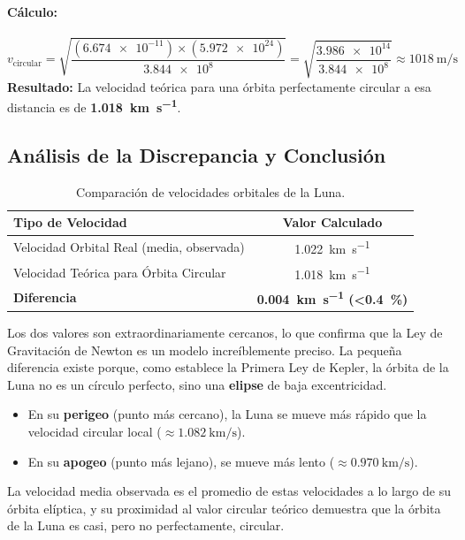 \documentclass[11pt,a4paper]{book}
\begin{document}
\paragraph{Cálculo:}
\[ 
v_{\text{circular}} = \sqrt{\frac{(\num{6.674e-11}) \times (\num{5.972e24})}{\num{3.844e8}}} 
= \sqrt{\frac{\num{3.986e14}}{\num{3.844e8}}} 
\approx \SI{1018}{\meter\per\second} 
\]
\textbf{Resultado:} La velocidad teórica para una órbita perfectamente circular a esa distancia es de \textbf{\SI{1.018}{\kilo\meter\per\second}}.

\subsection*{Análisis de la Discrepancia y Conclusión}

\begin{table}[h!]
\centering
\caption{Comparación de velocidades orbitales de la Luna.}
\label{tab:velocidad_luna}
\begin{tabular}{|l|c|}
\hline
\textbf{Tipo de Velocidad} & \textbf{Valor Calculado} \\
\hline \hline
Velocidad Orbital Real (media, observada) & \SI{1.022}{\kilo\meter\per\second} \\
\hline
Velocidad Teórica para Órbita Circular & \SI{1.018}{\kilo\meter\per\second} \\
\hline
\textbf{Diferencia} & \textbf{\SI{0.004}{\kilo\meter\per\second} (\textless \SI{0.4}{\percent})} \\
\hline
\end{tabular}
\end{table}

Los dos valores son extraordinariamente cercanos, lo que confirma que la Ley de Gravitación de Newton es un modelo increíblemente preciso. La pequeña diferencia existe porque, como establece la Primera Ley de Kepler, la órbita de la Luna no es un círculo perfecto, sino una \textbf{elipse} de baja excentricidad.
\begin{itemize}
    \item En su \textbf{perigeo} (punto más cercano), la Luna se mueve más rápido que la velocidad circular local ($\approx \SI{1.082}{\kilo\meter\per\second}$).
    \item En su \textbf{apogeo} (punto más lejano), se mueve más lento ($\approx \SI{0.970}{\kilo\meter\per\second}$).
\end{itemize}
La velocidad media observada es el promedio de estas velocidades a lo largo de su órbita elíptica, y su proximidad al valor circular teórico demuestra que la órbita de la Luna es casi, pero no perfectamente, circular.
\end{document}
